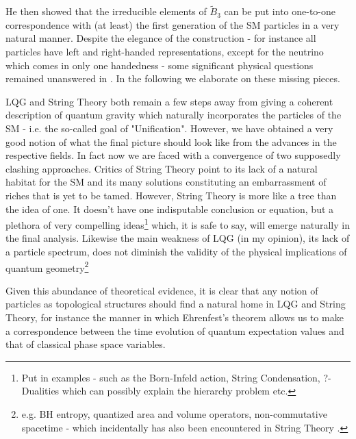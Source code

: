 \begin{doublespace}
He then showed that the irreducible elements of $\tilde{B}_3$ can be put into one-to-one correspondence with (at least) the first generation of the SM particles in a very natural manner. Despite the elegance of the construction - for instance all particles have left and right-handed representations, except for the neutrino which comes in only one handedness - some significant physical questions remained unanswered in \cite{BilsonThompson2006Quantum}. In the following we elaborate on these missing pieces.

LQG and String Theory both remain a few steps away from giving a coherent description of quantum gravity which naturally incorporates the particles of the SM - i.e. the so-called goal of "Unification". However, we have obtained a very good notion of what the final picture should look like from the advances in the respective fields. In fact now we are faced with a convergence of two supposedly clashing approaches. Critics of String Theory point to its lack of a natural habitat for the SM and its many solutions constituting an embarrassment of riches that is yet to be tamed. However, String Theory is more like a tree than the idea of one. It doesn't have one indisputable conclusion or equation, but a plethora of very compelling ideas\footnote{Put in examples - such as the Born-Infeld action, String Condensation, ?-Dualities which can possibly explain the hierarchy problem etc.} which, it is safe to say, will emerge naturally in the final analysis. Likewise the main weakness of LQG (in my opinion), its lack of a particle spectrum, does not diminish the validity of the physical implications of quantum geometry\footnote{e.g. BH entropy, quantized area and volume operators, non-commutative spacetime - which incidentally has also been encountered in String Theory \cite{Alexander2001Non-Commutative, Alexander2002Inflation}.}

Given this abundance of theoretical evidence, it is clear that any notion of particles as topological structures should find a natural home in LQG and String Theory, for instance the manner in which Ehrenfest's theorem allows us to make a correspondence between the time evolution of quantum expectation values and that of classical phase space variables.


\end{doublespace}
